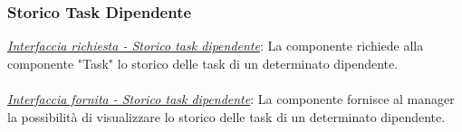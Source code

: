 \documentclass{report}
\begin{document}
\subsubsection*{\indent \indent Storico Task Dipendente}
\uline{\textit{Interfaccia richiesta - Storico task dipendente}}:
La componente richiede alla componente "Task" lo storico delle task di un determinato dipendente.\\\\
\uline{\textit{Interfaccia fornita - Storico task dipendente}}:
La componente fornisce al manager la possibilità di visualizzare lo storico delle task di un determinato dipendente.
\end{document}

